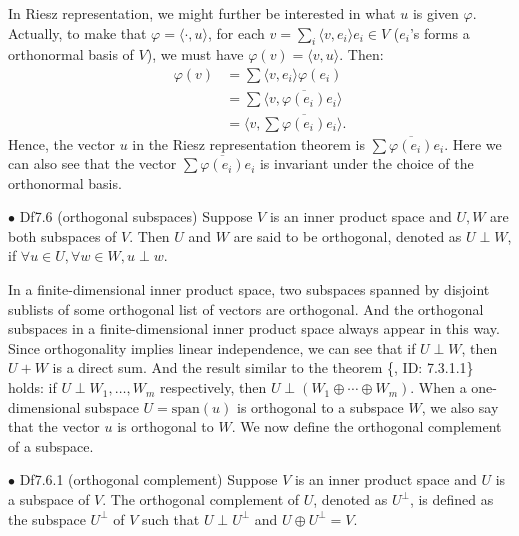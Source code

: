 \documentclass{article}
\begin{document}
\begin{Rmk}{}
    In Riesz representation, we might further be interested in what $u$ is given $\varphi$. Actually, to make that $\varphi = \langle \cdot, u\rangle$, for each $v=\sum_{i} \langle v, e_i\rangle e_i\in V$ ($e_i$'s forms a orthonormal basis of $V$), we must have $\varphi(v) = \langle v, u\rangle$. Then:
    $$
    \begin{aligned}
        \varphi(v) &= \sum \langle v, e_i\rangle \varphi(e_i)\\
        &= \sum \langle v, \overline{\varphi(e_i)} e_i\rangle\\
        &= \langle v, \sum \overline{\varphi(e_i)} e_i\rangle.
    \end{aligned}
    $$
    \textcolor{Th}{Hence, the vector $u$ in the Riesz representation theorem is $\sum \overline{\varphi(e_i)} e_i$.}
    Here we can also see that \textcolor{Th}{the vector $\sum \overline{\varphi(e_i)} e_i$ is invariant under the choice of the orthonormal basis.}
\end{Rmk}

\begin{Df}{$\bullet$ Df7.6 (orthogonal subspaces)}
    Suppose $V$ is an inner product space and $U, W$ are both subspaces of $V$. Then $U$ and $W$ are said to be orthogonal, denoted as $U\perp W$, if $\forall u\in U, \forall w\in W, u\perp w$.
\end{Df}

\begin{Rmk}{}
    \textcolor{Th}{In a finite-dimensional inner product space, two subspaces spanned by disjoint sublists of some orthogonal list of vectors are orthogonal. And the orthogonal subspaces in a finite-dimensional inner product space always appear in this way.} Since orthogonality implies linear independence, we can see that \textcolor{Th}{if $U\perp W$, then $U+W$ is a direct sum.} And the result similar to the theorem \{, ID: 7.3.1.1\} holds: \textcolor{Th}{if $U \perp W_1, \dots, W_m$ respectively, then $U\perp (W_1\oplus\cdots\oplus W_m)$.} \textcolor{Df}{When a one-dimensional subspace $U = \text{span}(u)$ is orthogonal to a subspace $W$, we also say that the vector $u$ is orthogonal to $W$.} We now define the orthogonal complement of a subspace.
\end{Rmk}

\begin{Df}{$\bullet$ Df7.6.1 (orthogonal complement)}
    Suppose $V$ is an inner product space and $U$ is a subspace of $V$. The orthogonal complement of $U$, denoted as $U^\perp$, is defined as the subspace $U^\perp$ of $V$ such that $U\perp U^\perp$ and $U\oplus U^\perp = V$.
\end{Df}
\end{document}
